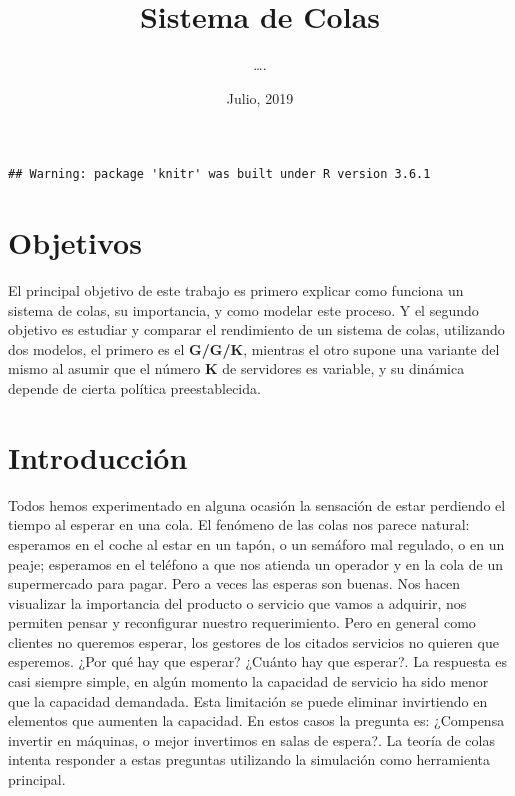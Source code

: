 \documentclass[]{article}
\title{Sistema de Colas}
\author{\ldots{}.}
\date{Julio, 2019}
\begin{document}
\maketitle

\begin{verbatim}
## Warning: package 'knitr' was built under R version 3.6.1
\end{verbatim}

\clearpage
\tableofcontents
\clearpage

\section{Objetivos}\label{objetivos}

El principal objetivo de este trabajo es primero explicar como funciona
un sistema de colas, su importancia, y como modelar este proceso. Y el
segundo objetivo es estudiar y comparar el rendimiento de un sistema de
colas, utilizando dos modelos, el primero es el \textbf{G/G/K}, mientras
el otro supone una variante del mismo al asumir que el número \textbf{K}
de servidores es variable, y su dinámica depende de cierta política
preestablecida.

\section{Introducción}\label{introduccion}

Todos hemos experimentado en alguna ocasión la sensación de estar
perdiendo el tiempo al esperar en una cola. El fenómeno de las colas nos
parece natural: esperamos en el coche al estar en un tapón, o un
semáforo mal regulado, o en un peaje; esperamos en el teléfono a que nos
atienda un operador y en la cola de un supermercado para pagar. Pero a
veces las esperas son buenas. Nos hacen visualizar la importancia del
producto o servicio que vamos a adquirir, nos permiten pensar y
reconfigurar nuestro requerimiento. Pero en general como clientes no
queremos esperar, los gestores de los citados servicios no quieren que
esperemos. ¿Por qué hay que esperar? ¿Cuánto hay que esperar?. La
respuesta es casi siempre simple, en algún momento la capacidad de
servicio ha sido menor que la capacidad demandada. Esta limitación se
puede eliminar invirtiendo en elementos que aumenten la capacidad. En
estos casos la pregunta es: ¿Compensa invertir en máquinas, o mejor
invertimos en salas de espera?. La teoría de colas intenta responder a
estas preguntas utilizando la simulación como herramienta principal.
\end{document}
